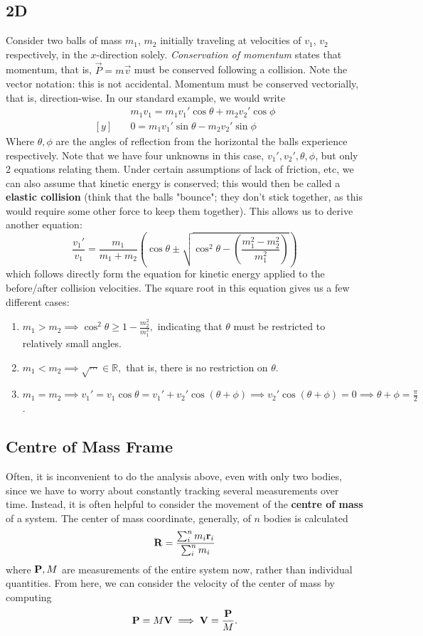 \documentclass[12pt]{article}
\begin{document}
\subsection{2D}
Consider two balls of mass $m_1$, $m_2$ initially traveling at velocities of $v_1$, $v_2$ respectively, in the $x$-direction solely. \textit{Conservation of momentum} states that momentum, that is, $\vec{P} = m \vec{v}$ must be conserved following a collision. Note the vector notation: this is not accidental. Momentum must be conserved vectorially, that is, direction-wise. In our standard example, we would write
\begin{align*}
[x]& \quad m_1 v_1 = m_1 v_1' \cos \theta + m_2 v_2' \cos \phi  \\
[y]& \quad 0 = m_1 v_1' \sin \theta - m_2 v_2' \sin \phi
\end{align*}
Where $\theta, \phi$ are the angles of reflection from the horizontal the balls experience respectively. Note that we have four unknowns in this case, $v_1', v_2', \theta, \phi$, but only 2 equations relating them. Under certain assumptions of lack of friction, etc, we can also assume that kinetic energy is conserved; this would then be called a \textbf{elastic collision} (think that the balls "bounce"; they don't stick together, as this would require some other force to keep them together). This allows us to derive another equation:
\[
\frac{v_1'}{v_1} = \frac{m_1}{m_1 + m_2}\left(\cos \theta \pm \sqrt{\cos^2 \theta - \left(\frac{m_1^2 - m_2^2}{m_1^2}\right)}\right)  
\]
which follows directly form the equation for kinetic energy applied to the before/after collision velocities. The square root in this equation gives us a few different cases:
\begin{enumerate}
  \item $m_1 > m_2 \implies \cos^2 \theta \geq 1 - \frac{m_2^2}{m_1^2},$ indicating that $\theta$ must be restricted to relatively small angles.
  \item $m_1 < m_2 \implies \sqrt{\cdots} \in \mathbb{R},$ that is, there is no restriction on $\theta$.
  \item $m_1 = m_2 \implies v_1' = v_1 \cos \theta = v_1' + v_2 ' \cos (\theta + \phi) \implies v_2' \cos (\theta + \phi) = 0 \implies \theta + \phi = \frac{\pi}{2}$.
\end{enumerate}

\subsection{Centre of Mass Frame}
Often, it is inconvenient to do the analysis above, even with only two bodies, since we have to worry about constantly tracking several measurements over time. Instead, it is often helpful to consider the movement of the \textbf{centre of mass} of a system. The center of mass coordinate, generally, of $n$ bodies is calculated
\[
\vb{R}  = \frac{\sum_{i}^{n} m_i \vb{r}_i} {\sum_i^n m_i}
\]
where $\vb{P}, M$ are measurements of the entire system now, rather than individual quantities. From here, we can consider the velocity of the center of mass by computing \[
\vb{P} = M \vb{V} \implies \vb{V} = \frac{\vb{P}}{M}.
\]
\end{document}
